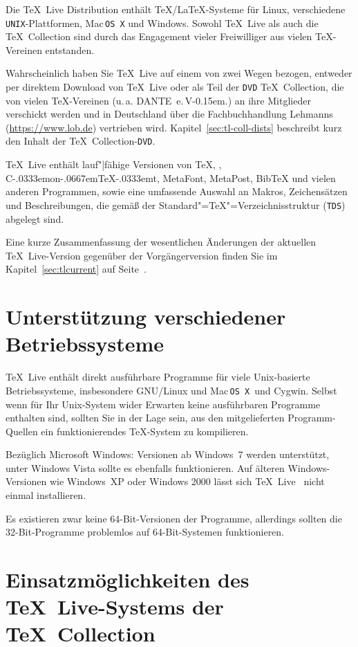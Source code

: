 \documentclass[12pt,ngerman,a4paper,fullparskip]{scrreprt}
\newcommand{\TL}{\TeX\ Live\xspace}
\newcommand{\acro}[1]{\texttt{#1}}
\def\TK{\TeX\ Collection}
\newcommand\ConTeXt{C\kern-.0333emon\-\kern-.0667em\TeX\kern-.0333emt}
\def\MP{MetaPost}
\def\MF{MetaFont}
\def\BibTeX{Bib\TeX}
\providecommand*{\DVD}{\acro{DVD}\xspace}
\providecommand*{\MacOSX}{Mac\,\acro{OS\,X}\xspace}
\providecommand*{\TDS}{\acro{TDS}\xspace}
\newcommand{\dante}{DANTE~e.\,V\kern-0.15em.}
\begin{document}
Die {\TL} Distribution enthält \TeX/\LaTeX-Systeme für Linux, verschiedene \acro{UNIX}-Plattformen, {\MacOSX} und Windows. Sowohl \TL{} als auch die \TK{} sind durch das Engagement vieler Freiwilliger aus vielen \TeX-Vereinen  entstanden. 

Wahrscheinlich haben Sie \TL{} auf einem von zwei Wegen bezogen, entweder per direktem Download von \TL{} oder als Teil der \DVD{} \TK, die von vielen \TeX-Vereinen (u.\,a. \dante) an ihre Mitglieder verschickt werden und in Deutschland über die Fachbuchhandlung Lehmanns (\url{https://www.lob.de})
vertrieben wird. Kapitel~\ref{sec:tl-coll-dists} beschreibt kurz den Inhalt der \TK-\DVD. 



{\TL} enthält lauf"|fähige Versionen von \TeX, \LaTeXe, \ConTeXt, \MF, \MP, {\BibTeX}  und vielen anderen Programmen, sowie eine umfassende Auswahl an Makros, Zeichensätzen und Beschreibungen, die gemäß der Standard"=\TeX"=Verzeichnisstruktur (\TDS) abgelegt sind.

Eine kurze Zusammenfassung der wesentlichen Änderungen der aktuellen \TL-Version gegenüber der Vorgängerversion finden Sie im Kapitel~\ref{sec:tlcurrent} auf Seite~\pageref{sec:tlcurrent}.

\section{Unterstützung verschiedener Betriebssysteme}\label{sec:os-support}

\TL{} enthält direkt ausführbare Programme für viele Unix-basierte Betriebssysteme, insbesondere GNU/Linux und \MacOSX\ und Cygwin. Selbst wenn für Ihr Unix-System wider Erwarten keine ausführbaren Programme enthalten sind, sollten Sie in der Lage sein, aus den mitgelieferten Programm-Quellen ein funktionierendes \TeX-System zu kompilieren.

Bezüglich Microsoft Windows: Versionen ab Windows~7 werden unterstützt, unter Windows Vista sollte es ebenfalls funktionieren. Auf älteren Windows-Versionen wie Windows~XP oder Windows 2000 lässt sich \TL~ nicht einmal installieren.

Es existieren zwar keine  64-Bit-Ver\-sionen der Programme, allerdings sollten die 32-Bit-Programme problemlos auf 64-Bit-Systemen funktionieren.

\section{Einsatzmöglichkeiten des \TL-Systems der \TeX\ Collection}\label{sec:basic}
\end{document}
